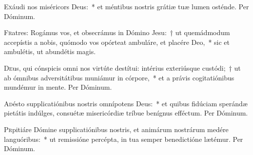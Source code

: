 \documentclass[vesperale_romanum.tex]{subfiles}
\begin{document}
\oratio

\lettrine{E}{x}áudi nos miséricors Deus:~* et méntibus nostris grátiæ tuæ lumen osténde. Per Dóminum.



\lettrine{F}{r}atres: Rogámus vos, et obsecrámus in Dómino Jesu:~† ut quemádmodum accepístis a nobis, quómodo vos opórteat ambuláre, et placére Deo,~* sic et ambulétis, ut abundétis magis.



\oratio

\lettrine{D}{e}us, qui cónspicis omni nos virtúte destítui: intérius exteriúsque custódi;~† ut ab ómnibus adversitátibus muniámur in córpore,~* et a právis cogitatiónibus mundémur in mente. Per Dóminum.




\oratio

\lettrine{A}{d}ésto supplicatiónibus nostris omnípotens Deus:~* et quibus fidúciam sperándæ pietátis indúlges, consuétæ misericórdiæ tríbue benígnus efféctum. Per Dóminum.



\oratio

\lettrine{P}{r}pitiáre Dómine supplicatiónibus nostris, et animárum nostrárum medére languóribus:~* ut remissióne percépta, in tua semper benedictióne lætémur. Per Dóminum.

\end{document}
